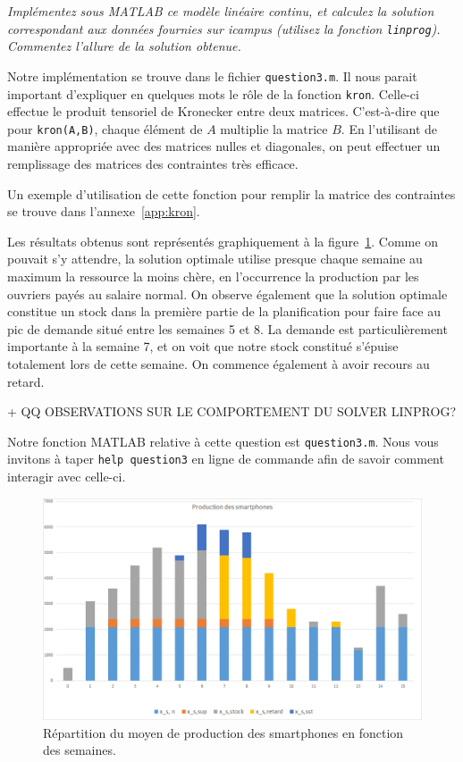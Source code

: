 \question %
\emph{Implémentez sous MATLAB ce modèle linéaire continu,
et calculez la solution correspondant aux données fournies sur icampus
(utilisez la fonction \texttt{linprog}).
Commentez l'allure de la solution obtenue.}

Notre implémentation se trouve dans le fichier \texttt{question3.m}.
Il nous parait important d'expliquer en quelques mots le r\^ole
de la fonction \texttt{kron}.
Celle-ci effectue le produit tensoriel de Kronecker entre deux matrices.
C'est-à-dire que pour \texttt{kron(A,B)},
chaque élément de $A$ multiplie la matrice $B$.
En l'utilisant de manière appropriée avec des matrices nulles et diagonales,
on peut effectuer un remplissage des matrices des contraintes très efficace.

Un exemple d'utilisation de cette fonction pour remplir la matrice
des contraintes se trouve dans l'annexe~\ref{app:kron}.

Les résultats obtenus sont représentés graphiquement
à la figure~\ref{fig:grapheProduction}.
Comme on pouvait s'y attendre, la solution optimale utilise presque chaque
semaine au maximum la ressource la moins chère,
en l'occurrence la production par les ouvriers payés au salaire normal.
On observe également que la solution optimale constitue un stock dans la première partie de la planification pour faire face au pic de demande
situé entre les semaines 5 et 8.
La demande est particulièrement importante à la semaine 7,
et on voit que notre stock constitué s'épuise totalement lors de cette semaine.
On commence également à avoir recours au retard.

+ QQ OBSERVATIONS SUR LE COMPORTEMENT DU SOLVER LINPROG?

Notre fonction MATLAB relative à cette question est \texttt{question3.m}. Nous vous invitons à taper \texttt{help question3} en ligne de commande afin de savoir comment interagir avec celle-ci.

\begin{figure}[H]
  \begin{center}
    \includegraphics[scale = 0.8]{img/grapheProduction.png}
	  \caption{Répartition du moyen de production des smartphones en fonction des semaines.}
	  \label{fig:grapheProduction}
  \end{center}
\end{figure}
